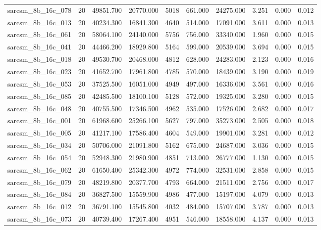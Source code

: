 \begin{tabular}{lrrrrrrrrr}
sarcsm\_8b\_16c\_078 & 20 & 49851.700 & 20770.000 & 5018 & 661.000 & 24275.000 & 3.251 & 0.000 & 0.012 \\
sarcsm\_8b\_16c\_013 & 20 & 40234.300 & 16841.300 & 4640 & 514.000 & 17091.000 & 3.611 & 0.000 & 0.013 \\
sarcsm\_8b\_16c\_061 & 20 & 58064.100 & 24140.000 & 5756 & 756.000 & 33340.000 & 1.960 & 0.000 & 0.015 \\
sarcsm\_8b\_16c\_041 & 20 & 44466.200 & 18929.800 & 5164 & 599.000 & 20539.000 & 3.694 & 0.000 & 0.015 \\
sarcsm\_8b\_16c\_018 & 20 & 49530.700 & 20468.000 & 4812 & 628.000 & 24283.000 & 2.123 & 0.000 & 0.016 \\
sarcsm\_8b\_16c\_023 & 20 & 41652.700 & 17961.800 & 4785 & 570.000 & 18439.000 & 3.190 & 0.000 & 0.019 \\
sarcsm\_8b\_16c\_053 & 20 & 37525.500 & 16051.000 & 4949 & 497.000 & 16336.000 & 3.561 & 0.000 & 0.016 \\
sarcsm\_8b\_16c\_085 & 20 & 42485.500 & 18100.100 & 5128 & 572.000 & 19325.000 & 3.280 & 0.000 & 0.015 \\
sarcsm\_8b\_16c\_048 & 20 & 40755.500 & 17346.500 & 4962 & 535.000 & 17526.000 & 2.682 & 0.000 & 0.017 \\
sarcsm\_8b\_16c\_001 & 20 & 61968.600 & 25266.100 & 5627 & 797.000 & 35273.000 & 2.505 & 0.000 & 0.018 \\
sarcsm\_8b\_16c\_005 & 20 & 41217.100 & 17586.400 & 4604 & 549.000 & 19901.000 & 3.281 & 0.000 & 0.012 \\
sarcsm\_8b\_16c\_034 & 20 & 50706.000 & 21091.800 & 5162 & 675.000 & 24687.000 & 3.036 & 0.000 & 0.015 \\
sarcsm\_8b\_16c\_054 & 20 & 52948.300 & 21980.900 & 4851 & 713.000 & 26777.000 & 1.130 & 0.000 & 0.015 \\
sarcsm\_8b\_16c\_062 & 20 & 61650.400 & 25342.300 & 4972 & 774.000 & 32531.000 & 2.858 & 0.000 & 0.015 \\
sarcsm\_8b\_16c\_079 & 20 & 48219.800 & 20377.700 & 4793 & 664.000 & 21511.000 & 2.756 & 0.000 & 0.017 \\
sarcsm\_8b\_16c\_084 & 20 & 36827.500 & 15559.900 & 4986 & 477.000 & 15197.000 & 4.079 & 0.000 & 0.013 \\
sarcsm\_8b\_16c\_012 & 20 & 36791.100 & 15545.800 & 4032 & 484.000 & 15707.000 & 3.787 & 0.000 & 0.013 \\
sarcsm\_8b\_16c\_073 & 20 & 40739.400 & 17267.400 & 4951 & 546.000 & 18558.000 & 4.137 & 0.000 & 0.013 \\

\end{tabular}
